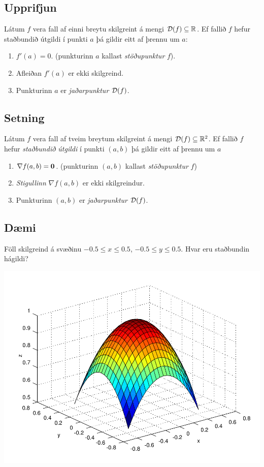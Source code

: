 \documentclass[a4paper,10pt,icelandic]{sphinxmanual}
\begin{document}
\subsection{Upprifjun}
\label{Kafli3:upprifjun}
Látum \(f\) vera fall af einni breytu skilgreint á mengi
\({\cal D}(f)\subseteq {\mathbb  R}\). Ef fallið \(f\) hefur
staðbundið útgildi í punkti \(a\) þá gildir eitt af þrennu um
\(a\):
\begin{enumerate}
\item {} 
\(f'(a)=0\). (punkturinn \(a\) kallast \textit{stöðupunktur}
\(f\)).

\item {} 
Afleiðan \(f'(a)\) er ekki skilgreind.

\item {} 
Punkturinn \(a\) er \textit{jaðarpunktur} \({\cal D}(f)\).

\end{enumerate}


\subsection{Setning}
\label{Kafli3:setning}
Látum \(f\) vera fall af tveim breytum skilgreint á mengi
\({\cal D}(f)\subseteq {\mathbb  R}^2\). Ef fallið \(f\) hefur
\textit{staðbundið útgildi} í punkti \((a,b)\) þá gildir eitt af þrennu um
\(a\)
\begin{enumerate}
\item {} 
\(\nabla f(a,b)=\mbox{${\bf 0}$}\). (punkturinn \((a,b)\)
kallast \textit{stöðupunktur} \(f\))

\item {} 
\textit{Stigullinn} \(\nabla f(a,b)\) er ekki skilgreindur.

\item {} 
Punkturinn \((a,b)\) er \textit{jaðarpunktur} \({\cal D}(f)\).

\end{enumerate}


\subsection{Dæmi}
\label{Kafli3:daemi}
Föll skilgreind á svæðinu \(-0.5 \leq x \leq 0.5\),
\(-0.5 \leq y \leq 0.5\). Hvar eru staðbundin hágildi?

{\hfill\includegraphics[width=0.600\linewidth]{peak_smooth.png}\hfill}
\end{document}
